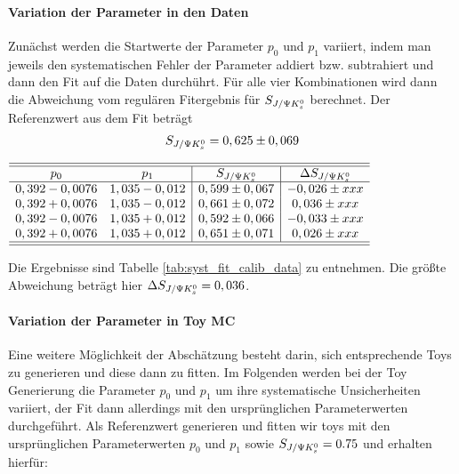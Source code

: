 \paragraph{Variation der Parameter in den Daten}
Zunächst werden die Startwerte der Parameter $p_0$ und $p_1$ variiert, indem man jeweils den systematischen Fehler der Parameter addiert bzw. subtrahiert und dann den Fit auf die Daten durchührt. Für alle vier Kombinationen wird dann die Abweichung vom regulären Fitergebnis für $\SJPsi$ berechnet. Der Referenzwert aus dem Fit beträgt
\begin{align}
S_{J/\Psi K_s^0} = 0,625 \pm 0,069
\end{align}

\begin{table}[hptb]
\centering
\caption{Variation des Fitergebnisses für $\SJPsi$ bei Veränderung der Startwerte für $p_0$ und $p_1$ $\pm$ ihrer statistischen Unsicherheiten}
\label{tab:syst_fit_calib_data}
$\begin{array}{cc|c|c}
\hline\hline
p_0            & p_1           & S_{J/\Psi K_s^0}          & \Delta S_{J/\Psi K_s^0}   \\ \hline
0,392 - 0,0076 & 1,035 - 0,012 & 0,599 \pm 0,067 & -0,026 \pm xxx \\
0,392 + 0,0076 & 1,035 - 0,012 & 0,661 \pm 0,072 & 0,036 \pm xxx \\
0,392 - 0,0076 & 1,035 + 0,012 & 0,592 \pm 0,066 & -0,033 \pm xxx \\
0,392 + 0,0076 & 1,035 + 0,012 & 0,651 \pm 0,071 & 0,026 \pm xxx \\
\hline\hline
\end{array}$
\end{table}

Die Ergebnisse sind Tabelle \ref{tab:syst_fit_calib_data} zu entnehmen. Die größte Abweichung beträgt hier $\Delta S_{J/\Psi K_s^0} = 0,036$.

\paragraph{Variation der Parameter in \gls{Toy MC}}
Eine weitere Möglichkeit der Abschätzung besteht darin, sich entsprechende Toys zu generieren und diese dann zu fitten. Im Folgenden werden bei der Toy Generierung die Parameter $p_0$ und $p_1$ um ihre systematische Unsicherheiten variiert, der Fit dann allerdings mit den ursprünglichen Parameterwerten durchgeführt. Als Referenzwert generieren und fitten wir toys mit den ursprünglichen Parameterwerten $p_0$ und $p_1$ sowie $S_{J/\Psi K_s^0} = 0.75$ und erhalten hierfür:

